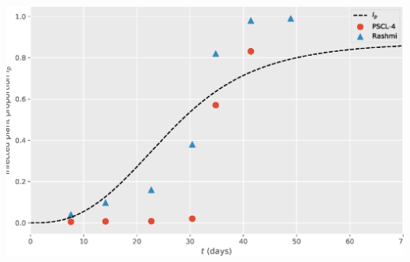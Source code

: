 \begin{frame}[plain]
{\begin{textblock*}{55mm}
				\includegraphics[width=\linewidth]{Feathergraphics/Simulation_data.eps}
			\end{textblock*}
		}
	\end{frame}
